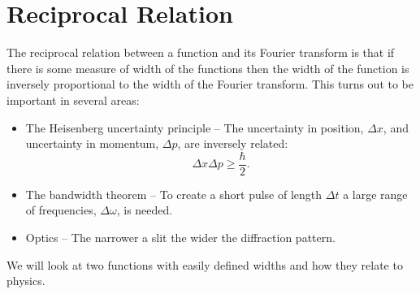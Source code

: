 \documentclass[a4paper]{article}
\begin{document}
    \section{Reciprocal Relation}
    The reciprocal relation between a function and its Fourier transform is that if there is some measure of width of the functions then the width of the function is inversely proportional to the width of the Fourier transform.
    This turns out to be important in several areas:
    \begin{itemize}
        \item The Heisenberg uncertainty principle -- The uncertainty in position, \(\Delta x\), and uncertainty in momentum, \(\Delta p\), are inversely related:
        \[\Delta x\Delta p \ge \frac{\hbar}{2}.\]
        \item The bandwidth theorem -- To create a short pulse of length \(\Delta t\) a large range of frequencies, \(\Delta\omega\), is needed.
        \item Optics -- The narrower a slit the wider the diffraction pattern.
    \end{itemize}
    We will look at two functions with easily defined widths and how they relate to physics.
    
\end{document}
